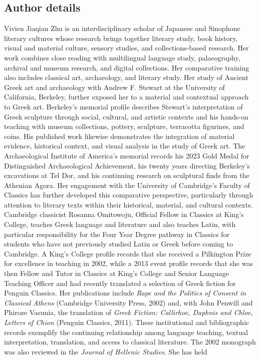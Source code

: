 \documentclass[numbers]{IntechOpen-Book}
\newcommand{\zh}[1]{{\CJKfontspec{Noto Serif CJK SC}\upshape #1}}
\begin{document}
\begin{backmatter}
\section*{Author details}
\begin{authordetails}
\author{Vivien Jiaqian Zhu (\zh{朱嘉倩})}
\address[1]{Stanford University, Stanford, California, United States}
\address{*Address all correspondence to: jvzhu@stanford.edu}

Vivien Jiaqian Zhu is an interdisciplinary scholar of Japanese and Sinophone literary cultures whose research brings together literary study, book history, visual and material culture, sensory studies, and collections-based research. Her work combines close reading with multilingual language study, palaeography, archival and museum research, and digital collections. Her comparative training also includes classical art, archaeology, and literary study. Her study of Ancient Greek art and archaeology with Andrew F. Stewart at the University of California, Berkeley, further exposed her to a material and contextual approach to Greek art. Berkeley's memorial profile describes Stewart's interpretation of Greek sculpture through social, cultural, and artistic contexts and his hands-on teaching with museum collections, pottery, sculpture, terracotta figurines, and coins. His published work likewise demonstrates the integration of material evidence, historical context, and visual analysis in the study of Greek art. The Archaeological Institute of America’s memorial records his 2023 Gold Medal for Distinguished Archaeological Achievement, his twenty years directing Berkeley’s excavations at Tel Dor, and his continuing research on sculptural finds from the Athenian Agora. \cite{stewart,stewartcv,stewartaia,stewart1990,stewart1996,stewart2014} Her engagement with the University of Cambridge's Faculty of Classics has further developed this comparative perspective, particularly through attention to literary texts within their historical, material, and cultural contexts. Cambridge classicist Rosanna Omitowoju, Official Fellow in Classics at King's College, teaches Greek language and literature and also teaches Latin, with particular responsibility for the Four Year Degree pathway in Classics for students who have not previously studied Latin or Greek before coming to Cambridge. A King's College profile records that she received a Pilkington Prize for excellence in teaching in 2002, while a 2013 event profile records that she was then Fellow and Tutor in Classics at King's College and Senior Language Teaching Officer and had recently translated a selection of Greek fiction for Penguin Classics. Her publications include \textit{Rape and the Politics of Consent in Classical Athens} (Cambridge University Press, 2002) and, with John Penwill and Phiroze Vasunia, the translation of \textit{Greek Fiction: Callirhoe, Daphnis and Chloe, Letters of Chion} (Penguin Classics, 2011). These institutional and bibliographic records exemplify the continuing relationship among language teaching, textual interpretation, translation, and access to classical literature. The 2002 monograph was also reviewed in the \textit{Journal of Hellenic Studies}. \cite{omitowojuprofile,omitowoju2002,omitowoju2002review,omitowoju2011} She has held 
\end{authordetails}
\end{backmatter}
\end{document}
